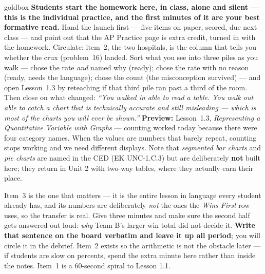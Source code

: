 \documentclass[10pt]{article}
\begin{document}
\boxguard
\begin{skillbox}{goldbox}
\textbf{Students start the homework here, in class, alone and silent --- this is the individual
practice, and the first minutes of it are your best formative read.} Hand the launch first ---
five items on paper, scored, due next class --- and point out that the AP Practice page is extra credit,
turned in with the homework. Circulate: item~2, the two hospitals, is the column that tells you
whether the crux (problem~16) landed. Sort what you see into three piles as you walk
--- chose the rate \emph{and} named why (ready); chose the rate with no reason (ready, needs the
language); chose the count (the misconception survived) --- and open Lesson~1.3 by reteaching if
that third pile ran past a third of the room. Then close on what changed:
\emph{``You walked in able to read a table. You walk out able to catch a chart that is
technically accurate and still misleading --- which is most of the charts you will ever be
shown.''} \textbf{Preview:} Lesson~1.3, \emph{Representing a Quantitative Variable with Graphs}
--- counting worked today because there were four category names. When the values are numbers
that barely repeat, counting stops working and we need different displays. Note that
\emph{segmented bar charts} and \emph{pie charts} are named in the CED (EK UNC-1.C.3) but are
deliberately \textbf{not} built here; they return in Unit 2 with two-way tables, where they
actually earn their place.
\end{skillbox}

\begin{teachernote}[Warm-Up]
Item~3 is the one that matters --- it is the entire lesson in language every student already
has, and its numbers are deliberately \emph{not} the ones the \emph{Wins First} row uses, so the
transfer is real. Give three minutes and make sure the second half gets answered out loud: \emph{why} Team
B's larger win total did not decide it. \textbf{Write that sentence on the board verbatim and
leave it up all period}; you will circle it in the debrief. Item~2 exists so the arithmetic is
not the obstacle later --- if students are slow on percents, spend the extra minute here rather
than inside the notes. Item~1 is a 60-second spiral to Lesson 1.1.
\end{teachernote}
\end{document}

